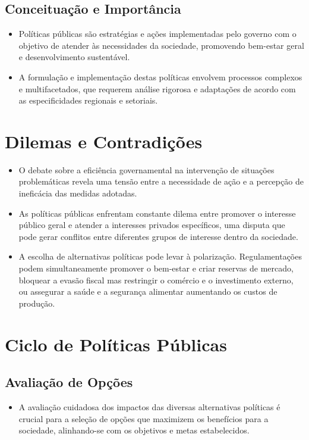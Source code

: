 \documentclass[
   article,       
   12pt,          
   oneside,       
   a4paper,       
   english,       
   brazil,        
   sumario=tradicional
   ]{abntex2}
\begin{document}
\subsection{Conceituação e Importância}
\begin{itemize}
\item Políticas públicas são estratégias e ações implementadas pelo governo com o objetivo de atender às necessidades da sociedade, promovendo bem-estar geral e desenvolvimento sustentável.
\item A formulação e implementação destas políticas envolvem processos complexos e multifacetados, que requerem análise rigorosa e adaptações de acordo com as especificidades regionais e setoriais.
\end{itemize}

\section{Dilemas e Contradições}
\begin{itemize}
\item O debate sobre a eficiência governamental na intervenção de situações problemáticas revela uma tensão entre a necessidade de ação e a percepção de ineficácia das medidas adotadas.
\item As políticas públicas enfrentam constante dilema entre promover o interesse público geral e atender a interesses privados específicos, uma disputa que pode gerar conflitos entre diferentes grupos de interesse dentro da sociedade.
\item A escolha de alternativas políticas pode levar à polarização. Regulamentações podem simultaneamente promover o bem-estar e criar reservas de mercado, bloquear a evasão fiscal mas restringir o comércio e o investimento externo, ou assegurar a saúde e a segurança alimentar aumentando os custos de produção.
\end{itemize}

\section{Ciclo de Políticas Públicas}
\subsection{Avaliação de Opções}
\begin{itemize}
\item A avaliação cuidadosa dos impactos das diversas alternativas políticas é crucial para a seleção de opções que maximizem os benefícios para a sociedade, alinhando-se com os objetivos e metas estabelecidos.
\end{itemize}
\end{document}
